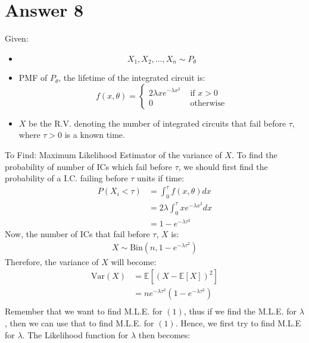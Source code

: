 \documentclass[a4paper]{article}
\begin{document}
\section{Answer 8}
Given:
\begin{itemize}
	\item {\[
				X_1,X_2,\dots,X_n \sim P_{\theta}
	\] }
\item{PMF of $P_{\theta}$, the lifetime of the integrated circuit is:
	\[
		f\left( x,\theta \right) =\begin{cases}
			2\lambda x e^{-\lambda x^2} & \text{ if } x > 0\\
			0&\text{ otherwise}
		\end{cases}
	\] 
	}
\item{$X$ be the R.V. denoting the number of integrated circuits that fail before $\tau$, where  $\tau > 0$ is a known time.}
\end{itemize}
To Find: Maximum Likelihood Estimator of the variance of $X$.
\newline\newline
To find the probability of number of ICs which fail before $\tau$, we should first find the probability of a I.C. failing before $\tau$ units if time:
\begin{equation*}
	\begin{split}
		P\left( X_i <\tau \right) &= \int_0^{\tau} f\left( x,\theta \right) dx\\
		&= 2\lambda\int_0^{\tau} x e^{-\lambda x^2}dx\\
		&= 1 - e^{-\lambda \tau^2}	
	\end{split}
\end{equation*}
Now, the number of ICs that fail before $\tau$, $X$ is:
\begin{equation*}
	\begin{split}
		X \sim \text{Bin}\left( n, 1 - e^{-\lambda \tau^2} \right) 
	\end{split}
\end{equation*}
Therefore, the variance of $X$ will become:
 \begin{equation}
	\begin{split}
		\text{Var}\left( X \right) &= \mathbb{E}\left[ \left( X-\mathbb{E}\left[ X \right]  \right) ^2 \right]\\
		&= n e^{-\lambda\tau^2}\left( 1 - e^{-\lambda\tau^2} \right)\\
	\end{split}
\end{equation}
Remember that we want to find M.L.E. for $\left( 1 \right) $, thus if we find the M.L.E. for $\lambda$, then we can use that to find M.L.E. for $\left( 1 \right) $. Hence, we first try to find M.L.E for $\lambda$. The Likelihood function for $\lambda$ then becomes:
\end{document}
